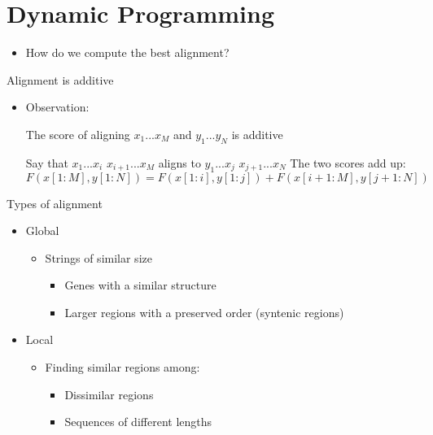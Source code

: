 \documentclass{bredelebeamer}
\begin{document}
 \section{Dynamic Programming}
 \begin{frame}{}
    \large{
    \begin{itemize}
 \item How do we compute the best alignment?
   \end{itemize} 
   
    }  
 \end{frame}
  \begin{frame}{Alignment is additive}
   
    \begin{itemize}
 \item Observation:

 \par The score of aligning $x_1...x_M$ and $y_1...y_N$ is additive
 \newline 
\par
   Say that \quad $x_1...x_i$ \quad $x_{i+1}...x_M$ \linebreak \quad aligns to \quad $y_1...x_j$ \quad $x_{j+1}...x_N$
   \newline
    \newline
    The two scores add up:
    \quad
   $$F(x[1:M], y[1:N]) = F(x[1:i], y[1:j]) + F(x[i+1:M], y[j+1:N])$$
   
   \end{itemize} 
 \end{frame}
 \begin{frame}{Types of alignment}
    \begin{itemize}
 \item Global
          \begin{itemize}
     \item Strings of similar size
      \begin{itemize}
     \item Genes with a similar structure
     \item Larger regions with a preserved order (syntenic
regions)
   \end{itemize} 
   \end{itemize} 
   \item Local
    \begin{itemize}
     \item Finding similar regions among:
      \begin{itemize}
     \item Dissimilar regions
     \item Sequences of different lengths
   \end{itemize} 
   \end{itemize}
   \end{itemize}  
 \end{frame}
\end{document}
